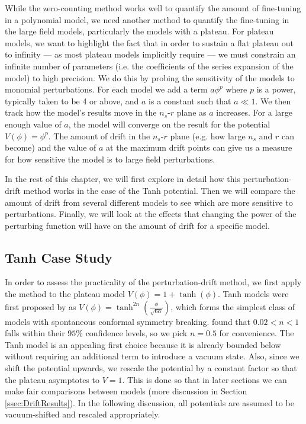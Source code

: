 \documentclass[a4paper,11pt]{article}
\def\nsr{$n_s$-$r$ }
\begin{document}
While the zero-counting method works well to quantify the amount of fine-tuning in a polynomial model, we need another method to quantify the fine-tuning in the large field models, particularly the models with a plateau. For plateau models, we want to highlight the fact that in order to sustain a flat plateau out to infinity --- as most plateau models implicitly require --- we must constrain an infinite number of parameters (i.e. the coefficients of the series expansion of the model) to high precision. We do this by probing the sensitivity of the models to monomial perturbations. For each model we add a term $a\phi^p$ where $p$ is a power, typically taken to be 4 or above, and $a$ is a constant such that $a\ll 1$. We then track how the model's results move in the \nsr plane as $a$ increases. For a large enough value of $a$, the model will converge on the result for the potential $V(\phi)=\phi^p$. The amount of drift in the \nsr plane (e.g. how large $n_s$ and $r$ can become) and the value of $a$ at the maximum drift points can give us a measure for how sensitive the model is to large field perturbations. 

In the rest of this chapter, we will first explore in detail how this perturbation-drift method works in the case of the Tanh potential. Then we will compare the amount of drift from several different models to see which are more sensitive to perturbations. Finally, we will look at the effects that changing the power of the perturbing function will have on the amount of drift for a specific model. 

\subsection{Tanh Case Study}
\label{ssec:TanhCaseStudy}

In order to assess the practicality of the perturbation-drift method, we first apply the method to the plateau model $V(\phi)=1+\tanh(\phi)$. Tanh models were first proposed by \citet{Kallosh+2013} as $V(\phi)=\tanh^{2n}(\tfrac{\phi}{\sqrt{6\alpha}})$, which forms the simplest class of models with spontaneous conformal symmetry breaking. \citet{Planck2015} found that $0.02<n<1$ falls within their $95\%$ confidence levels, so we pick $n=0.5$ for convenience. The Tanh model is an appealing first choice because it is already bounded below without requiring an additional term to introduce a vacuum state. Also, since we shift the potential upwards, we rescale the potential by a constant factor so that the plateau asymptotes to $V=1$. This is done so that in later sections we can make fair comparisons between models (more discussion in Section \ref{ssec:DriftResults}). In the following discussion, all potentials are assumed to be vacuum-shifted and rescaled appropriately.
\end{document}
